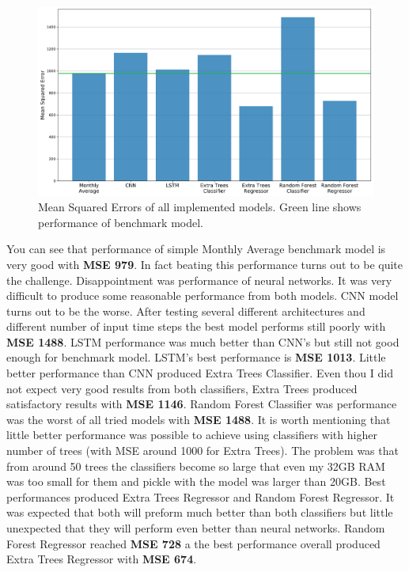 \documentclass{article}
\begin{document}
\begin{figure}[h!]
\centering
\includegraphics[width=16cm]{imgs/performance.png}
\caption{Mean Squared Errors of all implemented models. Green line shows performance of benchmark model.}
\label{fig:all_models_result}
\end{figure}

You can see that performance of simple Monthly Average benchmark model is very good with \textbf{MSE 979}. In fact beating this performance turns out to be quite the challenge. Disappointment was performance of neural networks. It was very difficult to produce some reasonable performance from both models. CNN model turns out to be the worse. After testing several different architectures and different number of input time steps the best model performs still poorly with \textbf{MSE 1488}. LSTM performance was much better than CNN's but still not good enough for benchmark model. LSTM's best performance is \textbf{MSE 1013}. Little better performance than CNN produced Extra Trees Classifier. Even thou I did not expect very good results from both classifiers, Extra Trees produced satisfactory results with \textbf{MSE 1146}. Random Forest Classifier was performance was the worst of all tried models with \textbf{MSE 1488}. It is worth mentioning that little better performance was possible to achieve using classifiers with higher number of trees (with MSE around 1000 for Extra Trees). The problem was that from around 50 trees the classifiers become so large that even my 32GB RAM was too small for them and pickle with the model was larger than 20GB. Best performances produced Extra Trees Regressor and Random Forest Regressor. It was expected that both will preform much better than both classifiers but little unexpected that they will perform even better than neural networks. Random Forest Regressor reached \textbf{MSE 728} a the best performance overall produced Extra Trees Regressor with \textbf{MSE 674}.
\end{document}

